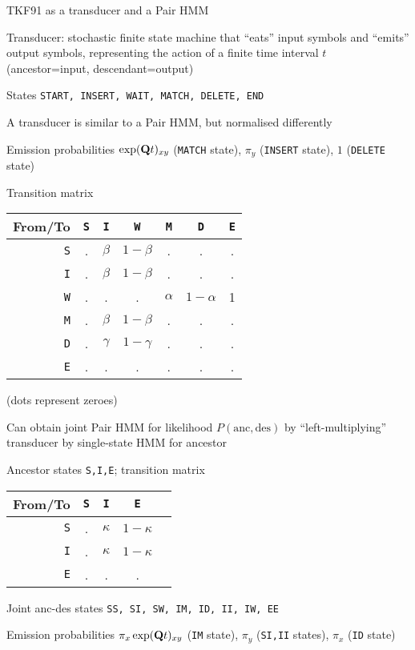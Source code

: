 \documentclass{beamer}
\begin{document}
\begin{frame}{}
TKF91 as a transducer and a Pair HMM
 \itemb
 \item Transducer: stochastic finite state machine that ``eats'' input symbols and ``emits'' output symbols,
representing the action of a finite time interval $t$ (ancestor=input, descendant=output)
  \itemb
  \item States {\tt START, INSERT, WAIT, MATCH, DELETE, END}
  \item A transducer is similar to a Pair HMM, but normalised differently
  \item Emission probabilities $\exp({\bf Q}t)_{xy}$ ({\tt MATCH} state), $\pi_y$ ({\tt INSERT} state), $1$ ({\tt DELETE} state)
  \iteme
 \iteme
\end{frame}

\begin{frame}{}
Transition matrix
\begin{tabular}{r|cccccc}
From/To & {\tt S} & {\tt I} & {\tt W} & {\tt M} & {\tt D} & {\tt E} \\
\hline
{\tt S} & . & $\beta$ & $1-\beta$ & . & . & . \\
{\tt I} & . & $\beta$ & $1-\beta$ & . & . & . \\
{\tt W} & . & . & . & $\alpha$ & $1-\alpha$ & 1 \\
{\tt M} & . & $\beta$ & $1-\beta$ & . & . & . \\
{\tt D} & . & $\gamma$ & $1-\gamma$ & . & . & . \\
{\tt E} & . & . & . & . & . & .
\end{tabular}
(dots represent zeroes)
\end{frame}

\begin{frame}{}
Can obtain joint Pair HMM for likelihood $P(\mbox{anc},\mbox{des})$ by ``left-multiplying'' transducer by single-state HMM for ancestor
  \itemb
  \item Ancestor states {\tt S,I,E}; transition matrix
\begin{tabular}{r|cccc}
From/To & {\tt S} & {\tt I} & {\tt E} \\
\hline
{\tt S} & . & $\kappa$ & $1-\kappa$ \\
{\tt I} & . & $\kappa$ & $1-\kappa$ \\
{\tt E} & . & . & .
\end{tabular}
  \item Joint anc-des states {\tt SS, SI, SW, IM, ID, II, IW, EE}
  \item Emission probabilities $\pi_x \exp({\bf Q}t)_{xy}$ ({\tt IM} state), $\pi_y$ ({\tt SI,II} states), $\pi_x$ ({\tt ID} state)
 \iteme
\end{frame}
\end{document}
